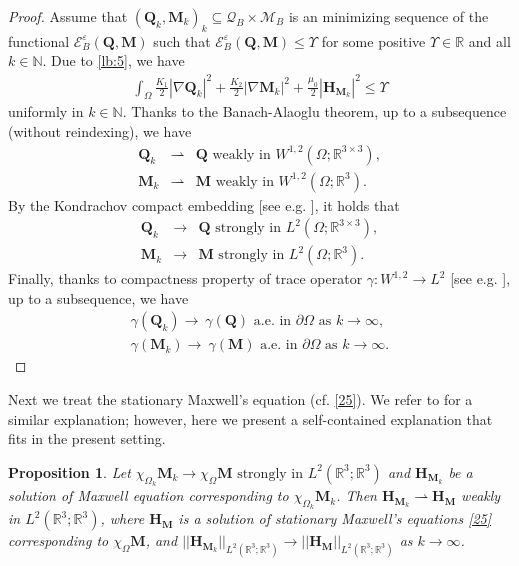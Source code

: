 \documentclass{article}
\newtheorem{proposition}[theorem]{Proposition}
\def\Qvec{\mathbf{Q}}
\def \Mvec{\mathbf{M}}
\def\Hvec{\mathbf{H}}
\begin{document}
\begin{proof}
Assume that $\left(\Qvec_k, \Mvec_k\right)_k \subseteq \mathcal{Q}_B \times \mathcal{M}_B$ is an minimizing sequence of the functional $\mathcal{E}^{\varepsilon}_B\left(\Qvec, \Mvec\right)$ such that $\mathcal{E}^{\varepsilon}_B\left(\Qvec, \Mvec\right)\le\Upsilon$ for some positive $\Upsilon\in\mathbb{R}$ and all $k\in \mathbb{N}$. Due to \eqref{lb:5}, we have
\begin{eqnarray}
\int_{\Omega} \frac{K_1}{2}|\nabla \Qvec_k|^2 + \frac{K_2}{2}|\nabla \Mvec_k|^2 + \frac{\mu_0}{2}|\Hvec_{\Mvec_k}|^2\le\Upsilon
\end{eqnarray}
uniformly in $k\in\mathbb{N}$. Thanks to the Banach-Alaoglu theorem, up to a subsequence (without reindexing), we have
\begin{eqnarray}
\Qvec_k&\rightharpoonup&\Qvec \mbox{ weakly in } W^{1,2}\left(\Omega; \mathbb R^{3\times 3}\right),\label{eq:Q-weak}\\
\Mvec_k&\rightharpoonup&\Mvec \mbox{ weakly in } W^{1,2}\left(\Omega; \mathbb R^{3}\right).\label{eq:M-weak}
\end{eqnarray}
By the Kondrachov compact embedding [see e.g. \cite{ciarlet2021mathematical}], it holds that
\begin{eqnarray}
\Qvec_k&\rightarrow&\Qvec \mbox{ strongly in } L^2\left(\Omega; \mathbb R^{3\times 3}\right), \label{eq:Q-strng}\\
\Mvec_k&\rightarrow&\Mvec \mbox{ strongly in } L^2\left(\Omega; \mathbb R^{3}\right). \label{eq:M-strng}
\end{eqnarray}
Finally, thanks to compactness property of trace operator $\gamma:W^{1,2}\rightarrow L^2$ [see e.g. \cite{ciarlet2021mathematical}], up to a subsequence, we have
\begin{eqnarray}
\gamma\left(\Qvec_k\right)\rightarrow~\gamma\left(\Qvec\right)\mbox{ a.e. in }\partial\Omega\mbox{ as }k\rightarrow\infty,\label{eq:ex7}\\
\gamma\left(\Mvec_k\right)\rightarrow~\gamma\left(\Mvec\right)\mbox{ a.e. in }\partial\Omega\mbox{ as }k\rightarrow\infty.\label{eq:ex8}  
\end{eqnarray}
\end{proof}
Next we treat the stationary Maxwell's equation (cf. \eqref{25}). We refer to \cite{Desimmone, MK, dutta2026existence} for a similar explanation; however, here we present a self-contained explanation that fits in the present setting.
\begin{proposition}\label{lem-str}
Let $\chi_{\Omega_k} \textbf{M}_k \rightarrow \chi_{\Omega} \textbf{M}\mbox{ strongly in } L^{2}\left(\mathbb R^3; \mathbb R^3 \right)$ and $\textbf{H}_{\textbf{M}_k}$ be a  solution of Maxwell equation corresponding to $\chi_{\Omega_k}\textbf{M}_k$. Then $\textbf{H}_{\textbf{M}_k} \rightharpoonup \textbf{H}_{\textbf{M}}$ weakly in $L^{2}\left(\mathbb R^3; \mathbb R^3 \right)$, where $\textbf{H}_{\textbf{M}}$ is a solution of stationary Maxwell's equations \eqref{25} corresponding to $\chi_{\Omega}\textbf{M}$, and $||\Hvec_{\Mvec_k}||_{L^2\left(\mathbb R^3; \mathbb R^3\right)}\rightarrow ||\Hvec_{\Mvec}||_{L^2\left(\mathbb R^3; \mathbb R^3\right)}$ as $k\rightarrow\infty$.
\end{proposition}
\end{document}
